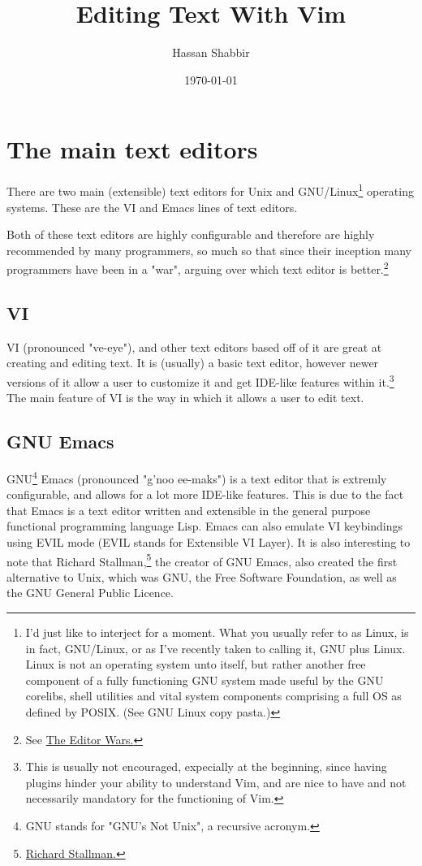 \documentclass[11pt]{article}
\author{Hassan Shabbir}
\date{\today}
\title{Editing Text With Vim}
\begin{document}
\maketitle
\tableofcontents

\newpage

\section{The main text editors}
\label{sec:org2c0e5ce}
There are two main (extensible) text editors for Unix and GNU/Linux\footnote{I'd just like to interject for a moment. What you usually refer to as Linux, is
in fact, GNU/Linux, or as I've recently taken to calling it, GNU plus Linux.
Linux is not an operating system unto itself, but rather another free component
of a fully functioning GNU system made useful by the GNU corelibs, shell
utilities and vital system components comprising a full OS as defined by POSIX.
(See GNU Linux copy pasta.)}
operating systems. These are the VI and Emacs lines of text editors.

Both of these text editors are highly configurable and therefore are highly
recommended by many programmers, so much so that since their inception many
programmers have been in a "war", arguing over which text editor is
better.\footnote{See \href{https://en.wikipedia.org/wiki/Editor\_war}{The Editor Wars.}}
\subsection{VI}
\label{sec:org23eff1d}
VI (pronounced "ve-eye"), and other text editors based off of it are great at
creating and editing text. It is (usually) a basic text editor, however newer
versions of it allow a user to customize it and get IDE-like features within
it.\footnote{This is usually not encouraged, expecially at the beginning, since
having plugins hinder your ability to understand Vim, and are nice to have and
not necessarily mandatory for the functioning of Vim.} The main feature of VI is the way in which it allows a user to edit
text.
\subsection{GNU Emacs}
\label{sec:org1b1fcca}
GNU\footnote{GNU stands for "GNU's Not Unix", a recursive acronym.} Emacs (pronounced "g'noo ee-maks") is a text editor that is extremly
configurable, and allows for a lot more IDE-like features. This is due to the
fact that Emacs is a text editor written and extensible in the general purpose
functional programming language Lisp. Emacs can also emulate VI keybindings
using EVIL mode (EVIL stands for Extensible VI Layer). It is also interesting to
note that Richard Stallman,\footnote{\href{https://en.wikipedia.org/wiki/Richard\_Stallman}{Richard Stallman.}} the creator of GNU Emacs, also created the
first alternative to Unix, which was GNU, the Free Software Foundation, as well
as the GNU General Public Licence.
\end{document}
